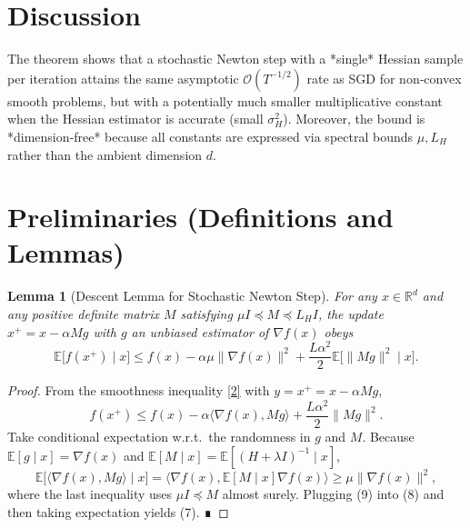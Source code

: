 \documentclass{article}
\newcommand{\E}{\mathbb{E}}
\newcommand{\R}{\mathbb{R}}
\newtheorem{lemma}{Lemma}
\begin{document}
\section*{Discussion}
The theorem shows that a stochastic Newton step with a *single* Hessian sample per iteration attains the same asymptotic $\mathcal{O}(T^{-1/2})$ rate as SGD for non‑convex smooth problems, but with a potentially much smaller multiplicative constant when the Hessian estimator is accurate (small $\sigma_{H}^{2}$). Moreover, the bound is *dimension‑free* because all constants are expressed via spectral bounds $\mu, L_H$ rather than the ambient dimension $d$.

\section*{Preliminaries (Definitions and Lemmas)}
\begin{lemma}[Descent Lemma for Stochastic Newton Step]\label{lem:descent}
For any $x\in\R^{d}$ and any positive definite matrix $M$ satisfying $\mu I\preceq M\preceq L_H I$, the update $x^{+}=x-\alpha M g$ with $g$ an unbiased estimator of $\nabla f(x)$ obeys
\[
\E\!\big[f(x^{+})\mid x\big]
\le
f(x)-\alpha\mu\|\nabla f(x)\|^{2}
+\frac{L\alpha^{2}}{2}\E\!\big[\|M g\|^{2}\mid x\big].
\tag{7}
\]
\end{lemma}
\begin{proof}
From the smoothness inequality \eqref{2} with $y=x^{+}=x-\alpha M g$,
\[
f(x^{+})\le f(x)-\alpha\langle\nabla f(x),Mg\rangle
+\frac{L\alpha^{2}}{2}\|Mg\|^{2}.
\tag{8}
\]
Take conditional expectation w.r.t.\ the randomness in $g$ and $M$.
Because $\E[g\mid x]=\nabla f(x)$ and $\E[M\mid x]=\E[(H+\lambda I)^{-1}\mid x]$,
\[
\E\!\big[\langle\nabla f(x),Mg\rangle\mid x\big]
= \langle\nabla f(x),\E[M\mid x]\nabla f(x)\rangle
\ge \mu\|\nabla f(x)\|^{2},
\tag{9}
\]
where the last inequality uses $\mu I\preceq M$ almost surely.  
Plugging (9) into (8) and then taking expectation yields (7). ∎
\end{proof}
\end{document}
